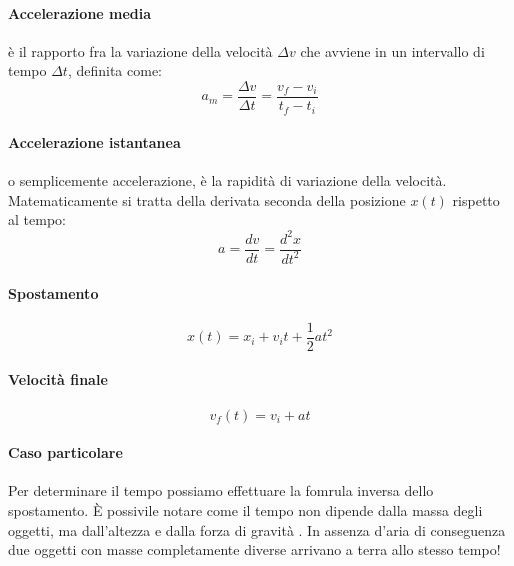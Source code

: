         \paragraph{Accelerazione media} è il rapporto fra la variazione della
        velocità $\Delta v$ che avviene in un intervallo di tempo $\Delta t$, 
        definita come:
        \begin{equation}
            a_m = \frac{\Delta v}{\Delta t} = \frac{v_f - v_i}{t_f - t_i}
        \end{equation}

        \paragraph{Accelerazione istantanea} o semplicemente accelerazione, è 
        la rapidità di variazione della velocità. Matematicamente si tratta 
        della derivata seconda della posizione $x(t)$ rispetto al tempo:
        \begin{equation}
            a = \frac{dv}{dt} = \frac{d^2x}{dt^2}
        \end{equation}

        \paragraph{Spostamento}
            \begin{equation}
                x(t) = x_i + v_it + \frac{1}{2}at^2
            \end{equation}

        \paragraph{Velocità finale}
            \begin{equation}
                v_f(t) = v_{i} + at
            \end{equation}
    
        \paragraph{Caso particolare}
            Per determinare il tempo possiamo effettuare la fomrula inversa 
            dello spostamento. È possivile notare come il tempo non dipende 
            dalla massa degli oggetti, ma dall'altezza e dalla forza di gravità
            . In assenza d'aria di conseguenza due oggetti con masse 
            completamente diverse arrivano a terra allo stesso tempo!

